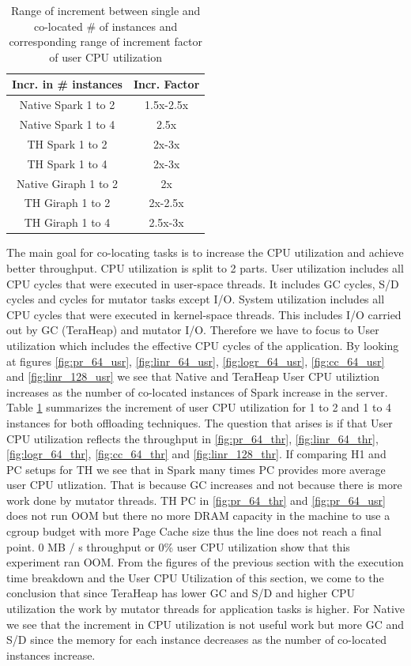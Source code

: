 \begin{table}[thbp]
  \centering
  \caption{Range of increment between single and co-located \# of instances and corresponding range of increment factor of user CPU utilization}
  \label{tab:user_factors}
  \begin{tabular}{|c|c|}
    \hline
    \textbf{Incr. in # instances} & \textbf{Incr. Factor} \\
    \hline
    Native Spark 1 to 2  & 1.5x-2.5x \\
    Native Spark 1 to 4 & 2.5x \\
    TH Spark 1 to 2 & 2x-3x \\
    TH Spark 1 to 4 & 2x-3x \\
    Native Giraph 1 to 2 & 2x \\
    TH Giraph 1 to 2 & 2x-2.5x \\
    TH Giraph 1 to 4 & 2.5x-3x \\
    \hline
  \end{tabular}
\end{table}


The main goal for co-locating tasks is to increase the CPU utilization and achieve better
throughput. CPU utilization is split to 2 parts. 
User utilization includes all CPU cycles that were executed in user-space threads.
It includes GC cycles, S/D cycles and cycles for mutator tasks except I/O.
System utilization includes all CPU cycles that were executed in kernel-space threads.
This includes I/O carried out by GC (TeraHeap) and mutator I/O.
Therefore we have to focus to User utilization which includes the effective CPU cycles of the application.
By looking at figures \ref{fig:pr_64_usr}, \ref{fig:linr_64_usr},
\ref{fig:logr_64_usr}, \ref{fig:cc_64_usr} and \ref{fig:linr_128_usr} we see that Native and TeraHeap User CPU utiliztion
increases as the number of co-located instances of Spark increase in the server.
Table \ref{tab:user_factors} summarizes the increment of user CPU utilization for 1 to 2 and 1 to 4 instances for both offloading techniques.
The question that arises is if that User CPU utilization reflects the throughput in \ref{fig:pr_64_thr}, \ref{fig:linr_64_thr},
\ref{fig:logr_64_thr}, \ref{fig:cc_64_thr} and \ref{fig:linr_128_thr}. If comparing H1 and PC setups for TH we see that in Spark many times PC provides more average user CPU utlization. That is because GC increases and not because there is more work done by mutator threads. TH PC in \ref{fig:pr_64_thr} and \ref{fig:pr_64_usr} does not run OOM but there no more DRAM capacity in the machine to use a cgroup budget with more Page Cache size thus the line does not reach a final point. 0 MB / s throughput or 0\% user CPU utilization show that this experiment ran OOM.
From the figures of the previous section with the execution time breakdown and the User CPU Utilization of this section, we come to the conclusion that since TeraHeap has lower GC and S/D and higher CPU utilization the work by mutator threads for application tasks is higher.
For Native we see that the increment in CPU utilization is not useful work but more GC and S/D since the memory for each instance decreases as the number of co-located instances increase.


